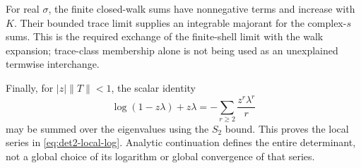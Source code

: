 For real \(\sigma\), the finite closed-walk sums have nonnegative terms and
increase with \(K\).  Their bounded trace limit supplies an integrable
majorant for the complex-\(s\) sums.  This is the required exchange of the
finite-shell limit with the walk expansion; trace-class membership alone is
not being used as an unexplained termwise interchange.

Finally, for \(|z|\|T\|<1\), the scalar identity
\[
  \log(1-z\lambda)+z\lambda
  =-\sum_{r\ge2}\frac{z^r\lambda^r}{r}
\]
may be summed over the eigenvalues using the \(S_2\) bound.  This proves the
local series in \cref{eq:det2-local-log}.  Analytic continuation defines
the entire determinant, not a global choice of its logarithm or global
convergence of that series.

